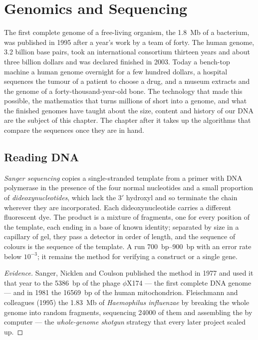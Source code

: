 \chapter{Genomics and Sequencing}\label{ch:b3:genomics}

The first complete genome of a free-living organism, the \qty{1.8}{Mb}
of a bacterium, was published in 1995 after a year's work by a team of
forty. The human genome, \num{3.2} billion base pairs, took an
international consortium thirteen years and about three billion
dollars and was declared finished in 2003. Today a bench-top machine
 a human genome overnight for a few hundred dollars, a hospital
sequences the tumour of a patient to choose a drug, and a museum
extracts and  the genome of a forty-thousand-year-old bone. The
technology that made this possible, the mathematics that turns
millions of short  into a genome, and what the finished genomes
have taught about the size, content and history of our DNA are the
subject of this chapter. The chapter after it takes up the algorithms
that compare the sequences once they are in hand.

\section{Reading DNA}

\begin{definition}\label{def:b3:genomics:sanger}
\emph{Sanger sequencing} copies a single-stranded template from a primer
with DNA polymerase in the presence of the four normal nucleotides and
a small proportion of \emph{dideoxynucleotides}, which lack the 3$'$
hydroxyl and so terminate the chain wherever they are incorporated.
Each dideoxynucleotide carries a different fluorescent dye. The
product is a mixture of fragments, one for every position of the
template, each ending in a base of known identity; separated by size
in a capillary of gel, they pass a detector in order of length, and
the sequence of colours is the sequence of the template. A run 
\qtyrange{700}{900}{bp} with an error rate below $10^{-3}$; it remains
the method for verifying a construct or a single gene.
\end{definition}

\begin{proof}[Evidence]
Sanger, Nicklen and Coulson published the method in 1977 and used it
that year to  the \qty{5386}{bp} of the phage $\phi$X174 --- the
first complete DNA genome --- and in 1981 the \qty{16569}{bp} of the
human mitochondrion. Fleischmann and colleagues (1995)  the
\qty{1.83}{Mb} of \emph{Haemophilus influenzae} by breaking the whole
genome into random fragments, sequencing \num{24000} of them and
assembling the  by computer --- the \emph{whole-genome shotgun}
strategy that every later project scaled up.
\end{proof}

